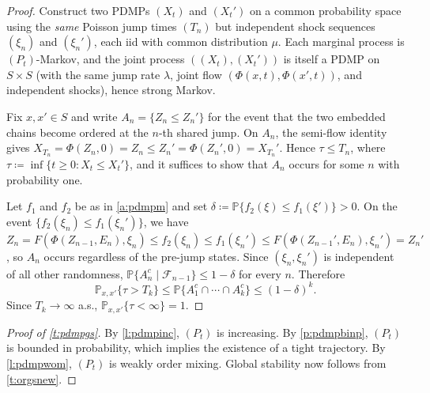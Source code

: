 \documentclass[12pt,reqno]{amsart}
\numberwithin{equation}{section}
\theoremstyle{definition}
\newcommand{\1}{\mathbbm{1}}
\newcommand{\PP}{\mathbb P}
\begin{document}
\begin{proof}
    Construct two PDMPs $(X_t)$ and $(X_t')$ on a common probability space
    using the \emph{same} Poisson jump times $(T_n)$ but independent
    shock sequences $(\xi_n)$ and $(\xi_n')$, each {\sc iid} with common
    distribution $\mu$.  Each marginal process is $(P_t)$-Markov, and the joint
    process $((X_t), (X_t'))$ is itself a PDMP on $S \times S$ (with the same
    jump rate $\lambda$, joint flow $(\Phi(x,t), \Phi(x',t))$, and independent
    shocks), hence strong Markov.

    Fix $x, x' \in S$ and write $A_n = \{Z_n \leq Z_n'\}$ for the event that
    the two embedded chains become ordered at the $n$-th shared jump.
    On $A_n$, the semi-flow identity gives $X_{T_n} = \Phi(Z_n, 0) = Z_n \leq
    Z_n' = \Phi(Z_n', 0) = X_{T_n}'$.  Hence $\tau
    \leq T_n$, where $\tau \coloneq \inf\{t \geq 0 : X_t \leq X_t'\}$, and it
    suffices to show that $A_n$ occurs for some $n$ with probability one.

    Let $f_1$ and $f_2$ be as in \cref{a:pdmpm}
    and set $\delta \coloneq \PP\{f_2(\xi) \leq
    f_1(\xi')\} > 0$.  On the event $\{f_2(\xi_n) \leq
    f_1(\xi_n')\}$, we have $Z_n = F(\Phi(Z_{n-1}, E_n), \xi_n)
    \leq f_2(\xi_n) \leq f_1(\xi_n') \leq
    F(\Phi(Z_{n-1}', E_n), \xi_n') = Z_n'$, so $A_n$ occurs regardless of
    the pre-jump states.  Since $(\xi_n, \xi_n')$ is independent of all
    other randomness, $\PP\{A_n^c \mid \mathcal{F}_{n-1}\} \leq 1 - \delta$
    for every $n$.  Therefore
    \begin{equation*}
        \PP_{x,x'}\{\tau > T_k\}
        \leq \PP\{A_1^c \cap \cdots \cap A_k^c\}
        \leq (1 - \delta)^k.
    \end{equation*}
    Since $T_k \to \infty$ a.s., $\PP_{x,x'}\{\tau < \infty\} = 1$.
\end{proof}

\begin{proof}[Proof of \cref{t:pdmpgs}]
    By \cref{l:pdmpinc}, $(P_t)$ is increasing.
    By \cref{p:pdmpbinp}, $(P_t)$ is bounded in probability, which implies the
    existence of a tight trajectory.
    By \cref{l:pdmpwom}, $(P_t)$ is weakly order mixing.
    Global stability now follows from \cref{t:orgsnew}.
\end{proof}



\end{document}
